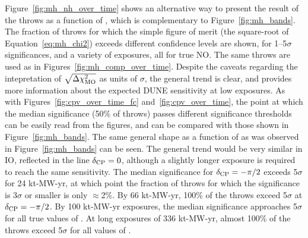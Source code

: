 Figure~\ref{fig:mh_nh_over_time} shows an alternative way to present the result of the throws as a function of \deltacp, which is complementary to Figure~\ref{fig:mh_bands}. The fraction of throws for which the simple figure of merit (the square-root of Equation~\ref{eq:mh_chi2}) exceeds different confidence levels are shown, for 1--5$\sigma$ significances, and a variety of exposures, all for true NO. The same throws are used as in Figures~\ref{fig:mh_comp_over_time}. Despite the caveats regarding the intepretation of $\sqrt{\Delta\chi^{2}_{\mathrm{MO}}}$ as units of $\sigma$, the general trend is clear, and provides more information about the expected DUNE sensitivity at low exposures. As with Figures~\ref{fig:cpv_over_time_fc} and~\ref{fig:cpv_over_time}, the point at which the median significance (50\% of throws) passes different significance thresholds can be easily read from the figures, and can be compared with those shown in Figure~\ref{fig:mh_bands}. The same general shape as a function of \deltacp as was observed in Figure~\ref{fig:mh_bands} can be seen. The general trend would be very similar in IO, reflected in the line $\delta_{\rm CP} = 0$, although a slightly longer exposure is required to reach the same sensitivity. The median significance for $\delta_{\rm CP} = -\pi/2$ exceeds 5$\sigma$ for 24 kt-MW-yr, at which point the fraction of throws for which the significance is 3$\sigma$ or smaller is only $\approx$2\%. By 66 kt-MW-yr, 100\% of the throws exceed 5$\sigma$ at $\delta_{\rm CP} = -\pi/2$. By 100 kt-MW-yr exposures, the median significance approaches 5$\sigma$ for all true values of \deltacp. At long exposures of 336 kt-MW-yr, almost 100\% of the throws exceed 5$\sigma$ for all values of \deltacp.
